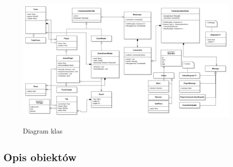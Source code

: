 \documentclass[11pt]{article}
\let\Oldsubsection\subsection
\renewcommand{\subsection}{\FloatBarrier\Oldsubsection}
\begin{document}
\begin{figure}
\caption{Diagram klas}
\hspace*{-4cm}
\resizebox{1.4\textheight}{!}
{
\includegraphics{../res/class_diagram}
}
\end{figure}
\FloatBarrier

\subsection{Opis obiektów}
\end{document}
